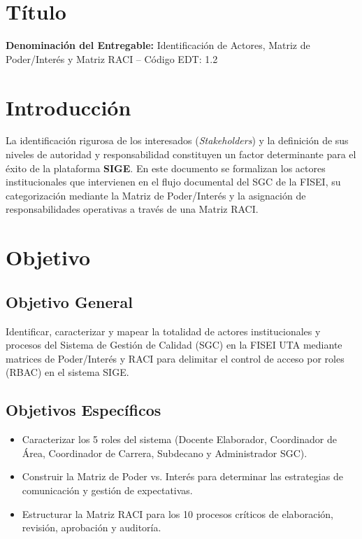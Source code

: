 \documentclass[12pt,a4paper]{article}
\begin{document}
\section{Título}
\textbf{Denominación del Entregable:} Identificación de Actores, Matriz de Poder/Interés y Matriz RACI -- Código EDT: 1.2



\section{Introducción}
La identificación rigurosa de los interesados (\textit{Stakeholders}) y la definición de sus niveles de autoridad y responsabilidad constituyen un factor determinante para el éxito de la plataforma \textbf{SIGE}. En este documento se formalizan los actores institucionales que intervienen en el flujo documental del SGC de la FISEI, su categorización mediante la Matriz de Poder/Interés y la asignación de responsabilidades operativas a través de una Matriz RACI.

\section{Objetivo}

\subsection{Objetivo General}
Identificar, caracterizar y mapear la totalidad de actores institucionales y procesos del Sistema de Gestión de Calidad (SGC) en la FISEI UTA mediante matrices de Poder/Interés y RACI para delimitar el control de acceso por roles (RBAC) en el sistema SIGE.

\subsection{Objetivos Específicos}
\begin{itemize}[leftmargin=1.5em, itemsep=1.5pt]
    \item Caracterizar los 5 roles del sistema (Docente Elaborador, Coordinador de Área, Coordinador de Carrera, Subdecano y Administrador SGC).
    \item Construir la Matriz de Poder vs. Interés para determinar las estrategias de comunicación y gestión de expectativas.
    \item Estructurar la Matriz RACI para los 10 procesos críticos de elaboración, revisión, aprobación y auditoría.
\end{itemize}
\end{document}
